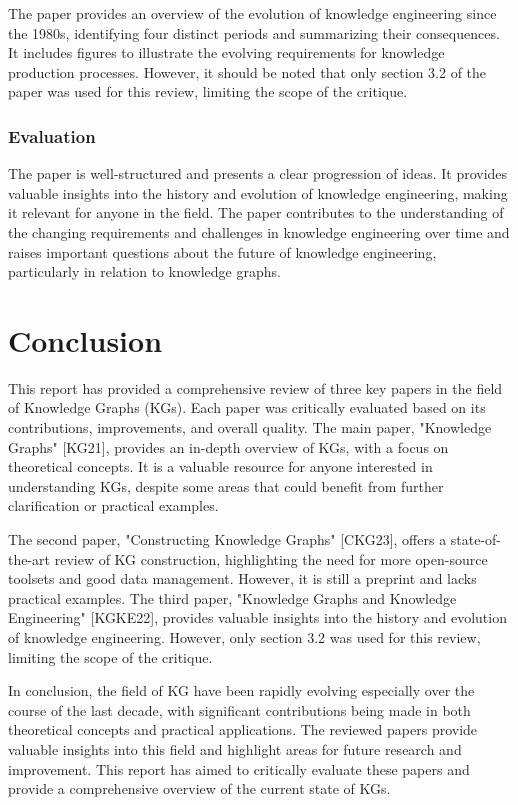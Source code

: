 \documentclass[11pt]{article} %
\begin{document}
The paper provides an overview of the evolution of knowledge engineering since the 1980s, identifying four distinct periods and summarizing their consequences. It includes figures to illustrate the evolving requirements for knowledge production processes. However, it should be noted that only section 3.2 of the paper was used for this review, limiting the scope of the critique.

\subsubsection*{Evaluation}

The paper is well-structured and presents a clear progression of ideas. It provides valuable insights into the history and evolution of knowledge engineering, making it relevant for anyone in the field. The paper contributes to the understanding of the changing requirements and challenges in knowledge engineering over time and raises important questions about the future of knowledge engineering, particularly in relation to knowledge graphs.

\section{Conclusion}

This report has provided a comprehensive review of three key papers in the field of Knowledge Graphs (KGs). Each paper was critically evaluated based on its contributions, improvements, and overall quality. The main paper, "Knowledge Graphs" [KG21], provides an in-depth overview of KGs, with a focus on theoretical concepts. It is a valuable resource for anyone interested in understanding KGs, despite some areas that could benefit from further clarification or practical examples.

The second paper, "Constructing Knowledge Graphs" [CKG23], offers a state-of-the-art review of KG construction, highlighting the need for more open-source toolsets and good data management. However, it is still a preprint and lacks practical examples. The third paper, "Knowledge Graphs and Knowledge Engineering" [KGKE22], provides valuable insights into the history and evolution of knowledge engineering. However, only section 3.2 was used for this review, limiting the scope of the critique.

In conclusion, the field of KG have been rapidly evolving especially over the course of the last decade, with significant contributions being made in both theoretical concepts and practical applications. The reviewed papers provide valuable insights into this field and highlight areas for future research and improvement. This report has aimed to critically evaluate these papers and provide a comprehensive overview of the current state of KGs.
\end{document}

